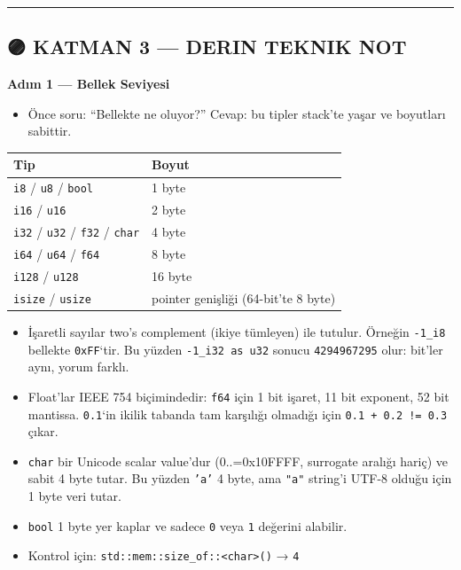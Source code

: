 \documentclass[12pt,a4paper]{article}
\begin{document}
\begin{center}\rule{0.5\linewidth}{0.5pt}\end{center}

\subsection{🟣 KATMAN 3 --- DERIN TEKNIK NOT}\label{katman-3-—-derin-teknik-not-3}

\textbf{Adım 1 --- Bellek Seviyesi}

\begin{itemize}
\tightlist
\item
  Önce soru: ``Bellekte ne oluyor?'' Cevap: bu tipler stack'te yaşar ve boyutları sabittir.
\end{itemize}

{\def\LTcaptype{none} %
\begin{longtable}[]{@{}ll@{}}
\toprule\noalign{}
Tip & Boyut \\
\midrule\noalign{}
\endhead
\bottomrule\noalign{}
\endlastfoot
\texttt{i8} / \texttt{u8} / \texttt{bool} & 1 byte \\
\texttt{i16} / \texttt{u16} & 2 byte \\
\texttt{i32} / \texttt{u32} / \texttt{f32} / \texttt{char} & 4 byte \\
\texttt{i64} / \texttt{u64} / \texttt{f64} & 8 byte \\
\texttt{i128} / \texttt{u128} & 16 byte \\
\texttt{isize} / \texttt{usize} & pointer genişliği (64-bit'te 8 byte) \\
\end{longtable}
}

\begin{itemize}
\tightlist
\item
  İşaretli sayılar two's complement (ikiye tümleyen) ile tutulur. Örneğin \texttt{-1\_i8} bellekte \texttt{0xFF}`tir. Bu yüzden \texttt{-1\_i32\ as\ u32} sonucu \texttt{4294967295} olur: bit'ler aynı, yorum farklı.
\item
  Float'lar IEEE 754 biçimindedir: \texttt{f64} için 1 bit işaret, 11 bit exponent, 52 bit mantissa. \texttt{0.1}`in ikilik tabanda tam karşılığı olmadığı için \texttt{0.1\ +\ 0.2\ !=\ 0.3} çıkar.
\item
  \texttt{char} bir Unicode scalar value'dur (0..=0x10FFFF, surrogate aralığı hariç) ve sabit 4 byte tutar. Bu yüzden \texttt{'a'} 4 byte, ama \texttt{"a"} string'i UTF-8 olduğu için 1 byte veri tutar.
\item
  \texttt{bool} 1 byte yer kaplar ve sadece \texttt{0} veya \texttt{1} değerini alabilir.
\item
  Kontrol için: \texttt{std::mem::size\_of::\textless{}char\textgreater{}()} → \texttt{4}
\end{itemize}
\end{document}

